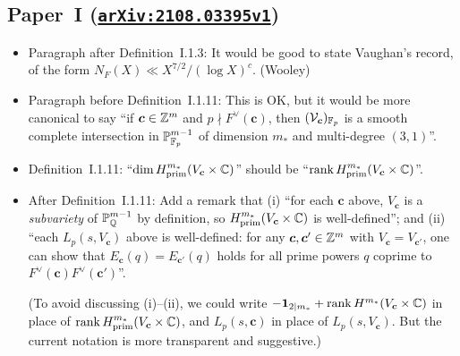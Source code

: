 \documentclass[12pt]{article}
\begin{document}
\subsection{Paper~I (\href{https://arxiv.org/abs/2108.03395v1}{\texttt{arXiv:2108.03395v1}})}

\begin{itemize}
    \item Paragraph after Definition~I.1.3:
    It would be good to state Vaughan's record, of the form $N_F(X)\ll X^{7/2}/(\log{X})^c$.
    (Wooley)
    
    \item Paragraph before Definition~I.1.11:
    This is OK,
    but it would be more canonical to say ``if $\bm{c}\in \mathbb{Z}^m$ and $p\nmid F^\vee(\bm{c})$, then $(\mathcal{V}_{\bm{c}})_{\mathbb{F}_p}$ is a smooth complete intersection in $\mathbb{P}^{m-1}_{\mathbb{F}_p}$ of dimension $m_\ast$ and multi-degree $(3,1)$''.
    
    \item Definition~I.1.11:
    ``$\dim H^{m_\ast}_{\operatorname{prim}}(V_{\bm{c}}\times\mathbb{C})$'' should be ``$\operatorname{rank} H^{m_\ast}_{\operatorname{prim}}(V_{\bm{c}}\times\mathbb{C})$''.
    
    \item After Definition~I.1.11:
    Add a remark that
    (i) ``for each $\bm{c}$ above,
    $V_{\bm{c}}$ is a \emph{subvariety} of $\mathbb{P}^{m-1}_{\mathbb{Q}}$ by definition,
    so $H^{m_\ast}_{\operatorname{prim}}(V_{\bm{c}}\times\mathbb{C})$ is well-defined'';
    and (ii) ``each $L_p(s,V_{\bm{c}})$ above is well-defined:
    for any $\bm{c},\bm{c}'\in \mathbb{Z}^m$ with $V_{\bm{c}}=V_{\bm{c}'}$,
    one can show that $E_{\bm{c}}(q) = E_{\bm{c}'}(q)$ holds for all prime powers $q$ coprime to $F^\vee(\bm{c})F^\vee(\bm{c}')$''.
    
    (To avoid discussing (i)--(ii),
    we could write $-\bm{1}_{2\mid m_\ast} + \operatorname{rank} H^{m_\ast}(V_{\bm{c}}\times\mathbb{C})$ in place of $\operatorname{rank} H^{m_\ast}_{\operatorname{prim}}(V_{\bm{c}}\times\mathbb{C})$,
    and $L_p(s,\bm{c})$ in place of $L_p(s,V_{\bm{c}})$.
    But the current notation is more transparent and suggestive.)
    
\end{itemize}
\end{document}

